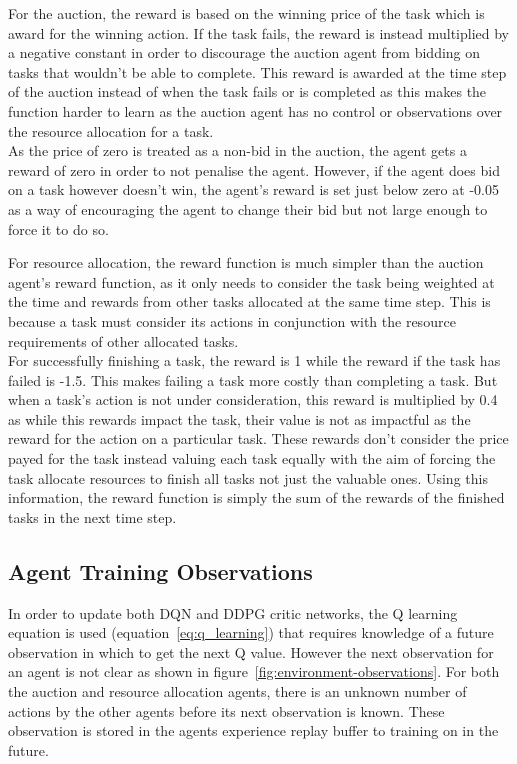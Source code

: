 For the auction, the reward is based on the winning price of the task which is award for the winning action. If the
task fails, the reward is instead multiplied by a negative constant in order to discourage the auction agent from
bidding on tasks that wouldn't be able to complete. This reward is awarded at the time step of the auction instead of
when the task fails or is completed as this makes the function harder to learn as the auction agent has no control or
observations over the resource allocation for a task. \\
As the price of zero is treated as a non-bid in the auction, the agent gets a reward of zero in order to not
penalise the agent. However, if the agent does bid on a task however doesn't win, the agent's reward is set just below
zero at -0.05 as a way of encouraging the agent to change their bid but not large enough to force it to do so.

For resource allocation, the reward function is much simpler than the auction agent's reward function, as it only needs
to consider the task being weighted at the time and rewards from other tasks allocated at the same time step. This is
because a task must consider its actions in conjunction with the resource requirements of other allocated tasks. \\
For successfully finishing a task, the reward is 1 while the reward if the task has failed is -1.5. This makes
failing a task more costly than completing a task. But when a task's action is not under consideration, this reward is
multiplied by 0.4 as while this rewards impact the task, their value is not as impactful as the reward for the action
on a particular task. These rewards don't consider the price payed for the task instead valuing each task equally with
the aim of forcing the task allocate resources to finish all tasks not just the valuable ones. Using this information,
the reward function is simply the sum of the rewards of the finished tasks in the next time step.

\subsection{Agent Training Observations}\label{subsec:agent-training-observations}
In order to update both DQN and DDPG critic networks, the Q learning equation is used (equation~\eqref{eq:q_learning})
that requires knowledge of a future observation in which to get the next Q value. However the next observation for an
agent is not clear as shown in figure~\ref{fig:environment-observations}. For both the auction and resource allocation
agents, there is an unknown number of actions by the other agents before its next observation is known. These
observation is stored in the agents experience replay buffer to training on in the future.


